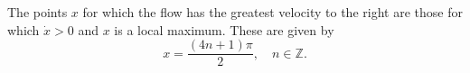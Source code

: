 
The points $x$ for which the flow has the greatest velocity to the right are those
for which $\dot{x} > 0$ and $x$ is a local maximum. These are given by 
\[
    x = \frac{(4n + 1)\pi}{2}, \quad n \in \mathbb{Z}.
\]
